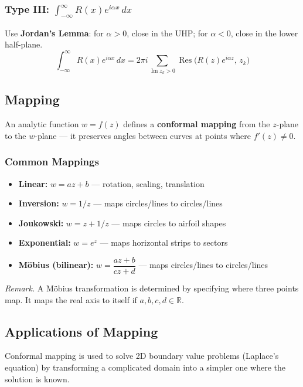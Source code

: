 \documentclass[11pt, letterpaper]{article}
\theoremstyle{plain}
\newenvironment{remark}{\smallskip\noindent\textit{Remark.}}{\smallskip}
\renewcommand{\Im}{\operatorname{Im}}
\renewcommand{\Res}{\operatorname{Res}}
\begin{document}
\subsubsection*{Type III: $\int_{-\infty}^{\infty} R(x)e^{i\alpha x}\,dx$}
Use \textbf{Jordan's Lemma}: for $\alpha > 0$, close in the UHP;
for $\alpha < 0$, close in the lower half-plane.
\[
    \int_{-\infty}^{\infty} R(x)e^{i\alpha x}\,dx
    = 2\pi i \sum_{\Im z_k > 0} \Res\bigl(R(z)e^{i\alpha z},\, z_k\bigr)
\]


\subsection{Mapping}

An analytic function $w = f(z)$ defines a \textbf{conformal mapping} from
the $z$-plane to the $w$-plane — it preserves angles between curves at
points where $f'(z) \neq 0$.

\subsubsection*{Common Mappings}
\begin{itemize}
    \item \textbf{Linear:} $w = az + b$ — rotation, scaling, translation
    \item \textbf{Inversion:} $w = 1/z$ — maps circles/lines to circles/lines
    \item \textbf{Joukowski:} $w = z + 1/z$ — maps circles to airfoil shapes
    \item \textbf{Exponential:} $w = e^z$ — maps horizontal strips to sectors
    \item \textbf{Möbius (bilinear):} $w = \dfrac{az+b}{cz+d}$ —
          maps circles/lines to circles/lines
\end{itemize}

\begin{remark}
    A Möbius transformation is determined by specifying where three points map.
    It maps the real axis to itself if $a,b,c,d \in \mathbb{R}$.
\end{remark}


\subsection{Applications of Mapping}

Conformal mapping is used to solve 2D boundary value problems
(Laplace's equation) by transforming a complicated domain into a
simpler one where the solution is known.
\end{document}
